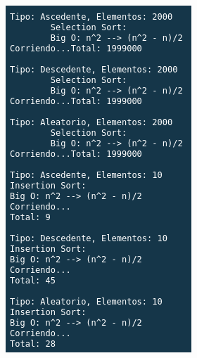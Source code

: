 \documentclass{article}
\begin{document}
			\begin{figure}[H]
				\begin{multicols}{2}
					\includegraphics[width = \linewidth]{images/e3-3}\par

\end{multicols}
\end{figure}
\end{document}
